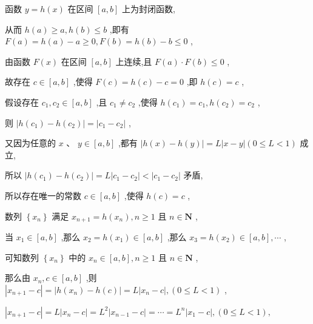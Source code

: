 \documentclass[10pt]{article}
\begin{document}
函数 \(y = h\left( x\right)\) 在区间 \(\left\lbrack  {a,b}\right\rbrack\) 上为封闭函数,

从而 \(h\left( a\right)  \geq  a,h\left( b\right)  \leq  b\) ,即有 \(F\left( a\right)  = h\left( a\right)  - a \geq  0,F\left( b\right)  = h\left( b\right)  - b \leq  0\) ,

由函数 \(F\left( x\right)\) 在区间 \(\left\lbrack  {a,b}\right\rbrack\) 上连续,且 \(F\left( a\right)  \cdot  F\left( b\right)  \leq  0\) ,

故存在 \(c \in  \left\lbrack  {a,b}\right\rbrack\) ,使得 \(F\left( c\right)  = h\left( c\right)  - c = 0\) ,即 \(h\left( c\right)  = c\) ,

假设存在 \({c}_{1},{c}_{2} \in  \left\lbrack  {a,b}\right\rbrack\) ,且 \({c}_{1} \neq  {c}_{2}\) ,使得 \(h\left( {c}_{1}\right)  = {c}_{1},h\left( {c}_{2}\right)  = {c}_{2}\) ,

则 \(\left| {h\left( {c}_{1}\right)  - h\left( {c}_{2}\right) }\right|  = \left| {{c}_{1} - {c}_{2}}\right|\) ,

又因为任意的 \(x\text{ 、 }y \in  \left\lbrack  {a,b}\right\rbrack\) ,都有 \(\left| {h\left( x\right)  - h\left( y\right) }\right|  = L\left| {x - y}\right| \left( {0 \leq  L < 1}\right)\) 成立,

所以 \(\left| {h\left( {c}_{1}\right)  - h\left( {c}_{2}\right) }\right|  = L\left| {{c}_{1} - {c}_{2}}\right|  < \left| {{c}_{1} - {c}_{2}}\right|\) 矛盾,

所以存在唯一的常数 \(c \in  \left\lbrack  {a,b}\right\rbrack\) ,使得 \(h\left( c\right)  = c\) ,

数列 \(\left\{  {x}_{n}\right\}\) 满足 \({x}_{n + 1} = h\left( {x}_{n}\right) ,n \geq  1\) 且 \(n \in  \mathbf{N}\) ,

当 \({x}_{1} \in  \left\lbrack  {a,b}\right\rbrack\) ,那么 \({x}_{2} = h\left( {x}_{1}\right)  \in  \left\lbrack  {a,b}\right\rbrack\) ,那么 \({x}_{3} = h\left( {x}_{2}\right)  \in  \left\lbrack  {a,b}\right\rbrack  ,\cdots\) ,

可知数列 \(\left\{  {x}_{n}\right\}\) 中的 \({x}_{n} \in  \left\lbrack  {a,b}\right\rbrack  ,n \geq  1\) 且 \(n \in  \mathbf{N}\) ,

那么由 \({x}_{n},c \in  \left\lbrack  {a,b}\right\rbrack\) ,则 \(\left| {{x}_{n + 1} - c}\right|  = \left| {h\left( {x}_{n}\right)  - h\left( c\right) }\right|  = L\left| {{x}_{n} - c}\right| ,\left( {0 \leq  L < 1}\right)\) ,

\(\left| {{x}_{n + 1} - c}\right|  = L\left| {{x}_{n} - c}\right|  = {L}^{2}\left| {{x}_{n - 1} - c}\right|  = \cdots  = {L}^{n}\left| {{x}_{1} - c}\right| ,\left( {0 \leq  L < 1}\right) ,\)
\end{document}
